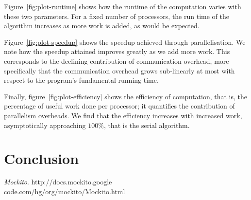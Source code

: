 \documentclass[11pt,twocolumn]{article} %
\begin{document}
Figure~\ref{fig:plot-runtime} shows how the runtime of the computation varies with these two parameters. For a fixed number of processors, the run time of the algorithm increases as more work is added, as would be expected.

Figure~\ref{fig:plot-speedup} shows the speedup achieved through parallelisation. We note how the speedup attained improves greatly as we add more work. This corresponds to the declining contribution of communication overhead, more specifically that the communication overhead grows sub-linearly at most with respect to the program's fundamental running time.

Finally, figure~\ref{fig:plot-efficiency} shows the efficiency of computation, that is, the percentage of useful work done per processor; it quantifies the contribution of parallelism overheads. We find that the efficiency increases with increased work, asymptotically approaching $100\%$, that is the serial algorithm.



\section{Conclusion}



\begin{thebibliography}{9}
  \emph{Mockito}.
  http://docs.mockito.google\\code.com/hg/org/mockito/Mockito.html  


  
\end{thebibliography}
\end{document}
